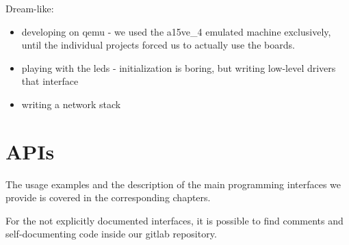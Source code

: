 \documentclass[a4paper,twoside,openright]{report}
\begin{document}
Dream-like:
\begin{itemize}
	\item developing on qemu - we used the a15ve\_4 emulated machine exclusively, until the individual projects forced us to actually use the boards.
	\item playing with the leds - initialization is boring, but writing low-level drivers that interface
	\item writing a network stack
\end{itemize}

\chapter{APIs}
The usage examples and the description of the main programming interfaces we provide is covered in the corresponding chapters.

For the not explicitly documented interfaces, it is possible to find comments and self-documenting code inside our gitlab repository.
\end{document}
